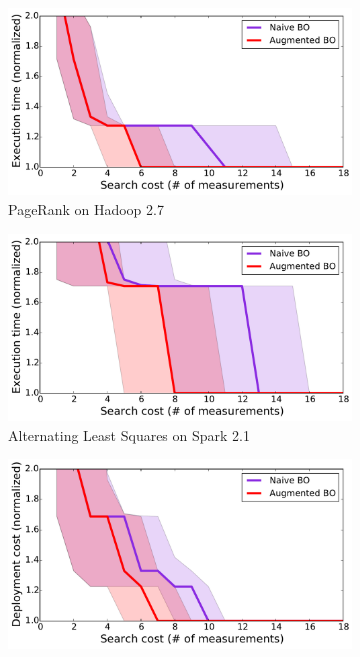 \begin{figure}[!htbp]
\centering
\begin{subfigure}[t]{0.6\textwidth}
    \includegraphics[width=\linewidth]{figures/time_hadoop.pagerank.large.pdf}
    \caption{PageRank on Hadoop 2.7}
    \label{fig:convergence_time_1}
\end{subfigure}
\begin{subfigure}[t]{0.6\textwidth}
    \includegraphics[width=\linewidth]{figures/time_spark.als.large.pdf}
    \caption{Alternating Least Squares on Spark 2.1}
    \label{fig:convergence_time_2}
\end{subfigure}
\begin{subfigure}[t]{0.6\textwidth}
    \includegraphics[width=\linewidth]{figures/cost_spark.lr.small.pdf}

\end{subfigure}
\end{figure}

